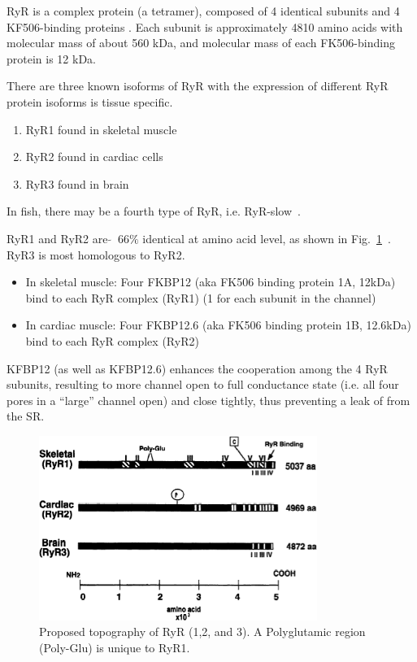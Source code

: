 RyR is a complex protein (a tetramer), composed of 4 identical subunits and 4
KF506-binding proteins \citep{Coronado1994}. Each subunit is approximately 4810 amino
acids with molecular mass of about 560 kDa, and molecular mass of each FK506-binding
protein is 12 kDa. 

There are three known isoforms of RyR with the expression of different RyR
protein isoforms is tissue specific.
\begin{enumerate}
  \item RyR1 found in skeletal muscle~\citep{Takeshima1989,Zorzato1990}

  \item RyR2 found in cardiac cells~\citep{Nakai1990,Otsu1990}

  \item RyR3 found in brain~\citep{Hakamata1992}
\end{enumerate}
In fish, there may be a fourth type of RyR, i.e.
RyR-slow~\citep{Morrissette2000}.

RyR1 and RyR2 are $\tilde{}\;\; 66\%$ identical at amino acid level, as
shown in Fig.~\ref{fig:RyR_topo}~\citep{marks1997icr}. RyR3 is most
homologous to RyR2.

\begin{itemize}
\item In skeletal muscle: Four FKBP12 (aka FK506 binding protein 1A,
  12kDa) bind to each RyR complex (RyR1) (1 for each subunit in the
  channel)

\item In cardiac muscle: Four FKBP12.6 (aka FK506 binding protein 1B,
  12.6kDa) bind to each RyR complex (RyR2)
\end{itemize}
KFBP12 (as well as KFBP12.6) enhances the cooperation among the 4 RyR
subunits, resulting to more channel open to full conductance state
(i.e. all four pores in a ``large'' channel open) and close tightly,
thus preventing a leak of  from the SR.

\begin{figure}[hbt]
  \centerline{\includegraphics[height=6cm]{./images/RyR_topography.eps}}
  \caption{Proposed topography of RyR (1,2, and 3). A Polyglutamic
    region (Poly-Glu) is unique to RyR1.}
  \label{fig:RyR_topo}
\end{figure}

